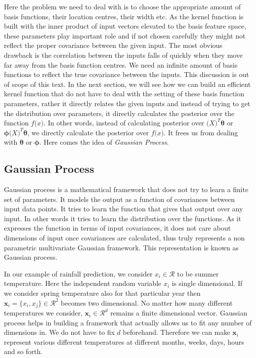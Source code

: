 \documentclass[english]{tktltiki}
\begin{document}
Here the problem we need to deal with is to choose the appropriate amount of basis functions, their location centres, their width etc. As the kernel function is built with the inner product of input vectors elevated to the basis feature space, these parameters play important role and if not chosen carefully they might not reflect the proper covariance between the given input. The most obvious drawback is the correlation between the inputs falls of quickly when they move far away from the basis function centres. We need an infinite amount of basis functions to reflect the true covariance between the inputs. This discussion is out of scope of this text. In the next section, we will see how we can build an efficient kernel function that do not have to deal with the setting of these basis function parameters, rather it directly relates the given inputs and instead of trying to get the distribution over parameters, it directly calculates the posterior over the function $f\mathbf(x)$. In other words, instead of calculating posterior over $\mathbf(X)^T \boldsymbol\theta$ or $\boldsymbol\phi \mathbf(X)^T \boldsymbol\theta$, we directly calculate the posterior over $f\mathbf(x)$. It frees us from dealing with $\boldsymbol \theta$ or $\boldsymbol \phi$. Here comes the idea of \textit{Gaussian Process}.

\subsection{Gaussian Process}

Gaussian process \cite{gaussian_process_for_machine_learning} is a mathematical framework that does not try to learn a finite set of parameters. It models the output as a function of covariances between input data points. It tries to learn the function that gives that output over any input. In other words it tries to learn the distribution over the functions. As it expresses the function in terms of input covariances, it does not care about dimensions of input once covariances are calculated, thus truly represents a non parametric multivariate Gaussian framework. This representation is known as Gaussian process.

In our example of rainfall prediction, we consider $x_i \in \mathcal{R}$ to be summer temperature. Here the independent random variable $x_i$ is single dimensional. If we consider spring temperature also for that particular year then $\mathbf{x}_i = \{x_i, x_j\} \in \mathcal{R}^2$ becomes two dimensional. No matter how many different temperatures we consider, $\mathbf{x}_i \in \mathcal{R}^d$ remains a finite dimensional vector. Gaussian process helps in building a framework that actually allows us to fit any number of dimensions in. We do not have to fix $d$ beforehand. Therefore we can make $\mathbf{x}_i$ represent various different temperatures at different months, weeks, days, hours and so forth.
\end{document}
